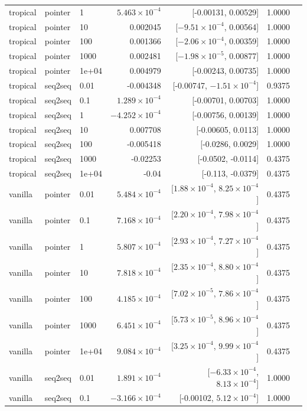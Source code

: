 \documentclass[10pt]{article}
\begin{document}
{\begin{longtable}{lllrrrl}
tropical & pointer & 1 & $5.463\times10^{-4}$ & [-0.00131, 0.00529] & 1.0000 & \\
tropical & pointer & 10 & 0.002045 & [$-9.51\times10^{-4}$, 0.00564] & 1.0000 & \\
tropical & pointer & 100 & 0.001366 & [$-2.06\times10^{-4}$, 0.00359] & 1.0000 & \\
tropical & pointer & 1000 & 0.002481 & [$-1.98\times10^{-5}$, 0.00877] & 1.0000 & \\
tropical & pointer & 1e+04 & 0.004979 & [-0.00243, 0.00735] & 1.0000 & \\
tropical & seq2seq & 0.01 & -0.004348 & [-0.00747, $-1.51\times10^{-4}$] & 0.9375 & \\
tropical & seq2seq & 0.1 & $1.289\times10^{-4}$ & [-0.00701, 0.00703] & 1.0000 & \\
tropical & seq2seq & 1 & $-4.252\times10^{-4}$ & [-0.00756, 0.00139] & 1.0000 & \\
tropical & seq2seq & 10 & 0.007708 & [-0.00605, 0.0113] & 1.0000 & \\
tropical & seq2seq & 100 & -0.005418 & [-0.0286, 0.0029] & 1.0000 & \\
tropical & seq2seq & 1000 & -0.02253 & [-0.0502, -0.0114] & 0.4375 & \\
tropical & seq2seq & 1e+04 & -0.04 & [-0.113, -0.0379] & 0.4375 & \\
vanilla & pointer & 0.01 & $5.484\times10^{-4}$ & [$1.88\times10^{-4}$, $8.25\times10^{-4}$] & 0.4375 & \\
vanilla & pointer & 0.1 & $7.168\times10^{-4}$ & [$2.20\times10^{-4}$, $7.98\times10^{-4}$] & 0.4375 & \\
vanilla & pointer & 1 & $5.807\times10^{-4}$ & [$2.93\times10^{-4}$, $7.27\times10^{-4}$] & 0.4375 & \\
vanilla & pointer & 10 & $7.818\times10^{-4}$ & [$2.35\times10^{-4}$, $8.80\times10^{-4}$] & 0.4375 & \\
vanilla & pointer & 100 & $4.185\times10^{-4}$ & [$7.02\times10^{-5}$, $7.86\times10^{-4}$] & 0.4375 & \\
vanilla & pointer & 1000 & $6.451\times10^{-4}$ & [$5.73\times10^{-5}$, $8.96\times10^{-4}$] & 0.4375 & \\
vanilla & pointer & 1e+04 & $9.084\times10^{-4}$ & [$3.25\times10^{-4}$, $9.99\times10^{-4}$] & 0.4375 & \\
vanilla & seq2seq & 0.01 & $1.891\times10^{-4}$ & [$-6.33\times10^{-4}$, $8.13\times10^{-4}$] & 1.0000 & \\
vanilla & seq2seq & 0.1 & $-3.166\times10^{-4}$ & [-0.00102, $5.12\times10^{-4}$] & 1.0000 & \\

\end{longtable}}
\end{document}
